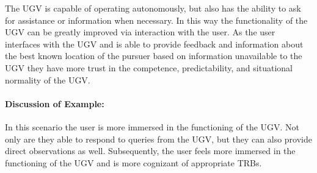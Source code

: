 The UGV is capable of operating autonomously, but also has the ability to ask for assistance or information when necessary. In this way the functionality of the UGV can be greatly improved via interaction with the user. As the user interfaces with the UGV and is able to provide feedback and information about the best known location of the pursuer based on information unavailable to the UGV they have more trust in the competence, predictability, and situational normality of the UGV.

\paragraph{\textbf{Discussion of Example:}} In this scenario the user is more immersed in the functioning of the UGV. Not only are they able to respond to queries from the UGV, but they can also provide direct observations as well. Subsequently, the user feels more immersed in the functioning of the UGV and is more cognizant of appropriate TRBs.
